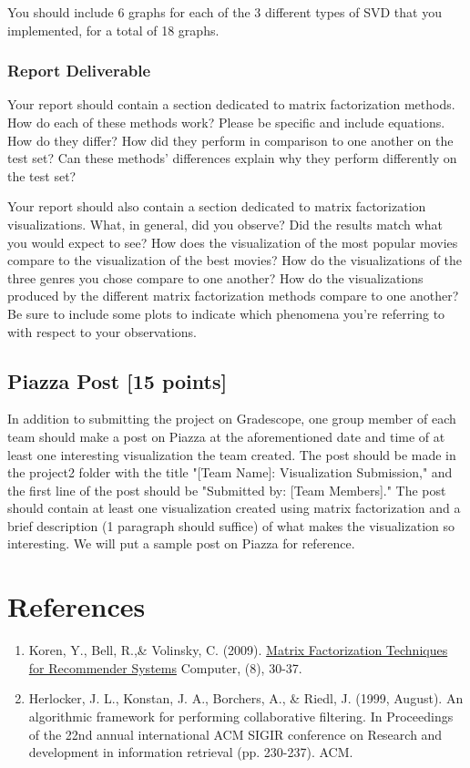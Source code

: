 You should include 6 graphs for each of the 3 different types of SVD that you implemented, for a total of 18 graphs.


\subsubsection{Report Deliverable}
Your report should contain a section dedicated to matrix factorization methods. How do each of these methods work? Please be specific and include equations. How do they differ? How did they perform in comparison to one another on the test set? Can these methods' differences explain why they perform differently on the test set?

Your report should also contain a section dedicated to matrix factorization visualizations. What, in general, did you observe? Did the results match what you would expect to see? How does the visualization of the most popular movies compare to the visualization of the best movies? How do the visualizations of the three genres you chose compare to one another? How do the visualizations produced by the different matrix factorization methods compare to one another? Be sure to include some plots to indicate which phenomena you’re referring to with respect to your observations.



\subsection{Piazza Post [15 points]}
In addition to submitting the project on Gradescope, one group member of each team should make a post on Piazza at the aforementioned date and time of at least one interesting visualization the team created. The post should be made in the project2 folder with the title "[Team Name]: Visualization Submission," and the first line of the post should be "Submitted by: [Team Members]." The post should contain at least one visualization created using matrix factorization and a brief description (1 paragraph should suffice) of what makes the visualization so interesting. We will put a sample post on Piazza for reference.




\section*{References}
\begin{enumerate}
	\item Koren, Y., Bell, R.,\&  Volinsky, C. (2009). \href{https://datajobs.com/data-science-repo/Recommender-Systems-\%5BNetflix\%5D.pdf}{Matrix Factorization Techniques for Recommender Systems} Computer, (8), 30-37.
	\item Herlocker, J. L., Konstan, J. A., Borchers, A., \& Riedl, J. (1999, August). An algorithmic framework for performing collaborative filtering. In Proceedings of the 22nd annual international ACM SIGIR conference on Research and development in information retrieval (pp. 230-237). ACM.
\end{enumerate}


